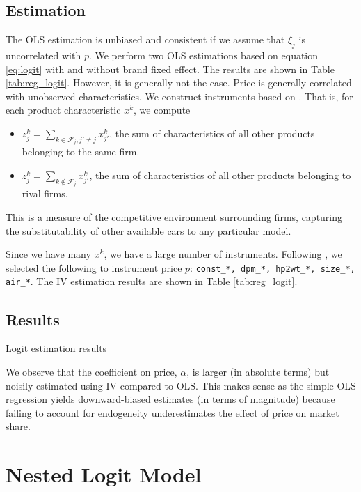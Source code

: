 \documentclass[12pt]{article}[margin=1in]
\begin{document}
\subsection{Estimation}
The OLS estimation is unbiased and consistent if we assume that $\xi_j$ is
uncorrelated with $p$. We perform two OLS estimations based on equation
\eqref{eq:logit} with and without brand fixed effect. The results are shown in
Table \ref{tab:reg_logit}. However, it is generally not the case. Price is
generally correlated with unobserved characteristics. We construct instruments
based on \citet{berrylevinsohnpakes1995}. That is, for each product
characteristic $x^k$, we compute
\begin{itemize}
    \item $z^k_{j}=\sum_{k\in \mathcal{F}_j, j'\neq j}x^k_{j'}$, the sum of characteristics of all other products belonging to the same firm.
    \item $z^k_{j}=\sum_{k\notin \mathcal{F}_j}x^k_{j'}$, the sum of characteristics of all other products belonging to rival firms.
\end{itemize}
This is a measure of the competitive environment surrounding firms, capturing the substitutability of other available cars to any particular model.

Since we have many $x^k$, we have a large number of instruments. Following
\citet{berrylevinsohnpakes1995}, we selected the following to instrument price
$p$: \verb|const_*, dpm_*, hp2wt_*, size_*, air_*|. The IV estimation results
are shown in Table \ref{tab:reg_logit}.

\subsection{Results}

\begin{table}[h!]
    \fontsize{8pt}{10pt}\selectfont
    \centering
    
    \caption{Logit estimation results}
    \label{tab:reg_logit}
\end{table}

We observe that the coefficient on price, $\alpha$, is larger (in absolute
terms) but noisily estimated using IV compared to OLS. This makes sense as the
simple OLS regression yields downward-biased estimates (in terms of magnitude)
because failing to account for endogeneity underestimates the effect of price
on market share.

\section{Nested Logit Model}
\end{document}

